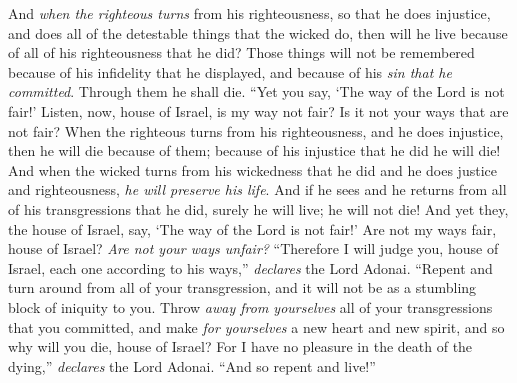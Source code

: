 \begin{biblechapter}
\verse And \textit{when the righteous turns} from his righteousness, so that he does injustice, and does all of the detestable things that the wicked do, then will he live because of all of his righteousness that he did? Those things will not be remembered because of his infidelity that he displayed, and because of his \textit{sin that he committed}. Through them he shall die.
\verse “Yet you say, ‘The way of the Lord is not fair!’ Listen, now, house of Israel, is my way not fair? Is it not your ways that are not fair?
\verse When the righteous turns from his righteousness, and he does injustice, then he will die because of them; because of his injustice that he did he will die!
\verse And when the wicked turns from his wickedness that he did and he does justice and righteousness, \textit{he will preserve his life}.
\verse And if he sees and he returns from all of his transgressions that he did, surely he will live; he will not die!
\verse And yet they, the house of Israel, say, ‘The way of the Lord is not fair!’ Are not my ways fair, house of Israel? \textit{Are not your ways unfair?}
\verse “Therefore I will judge you, house of Israel, each one according to his ways,” \textit{declares} the Lord Adonai. “Repent and turn around from all of your transgression, and it will not be as a stumbling block of iniquity to you.
\verse Throw \textit{away from yourselves} all of your transgressions that you committed, and make \textit{for yourselves} a new heart and new spirit, and so why will you die, house of Israel?
\verse For I have no pleasure in the death of the dying,” \textit{declares} the Lord Adonai. “And so repent and live!”
\end{biblechapter}

